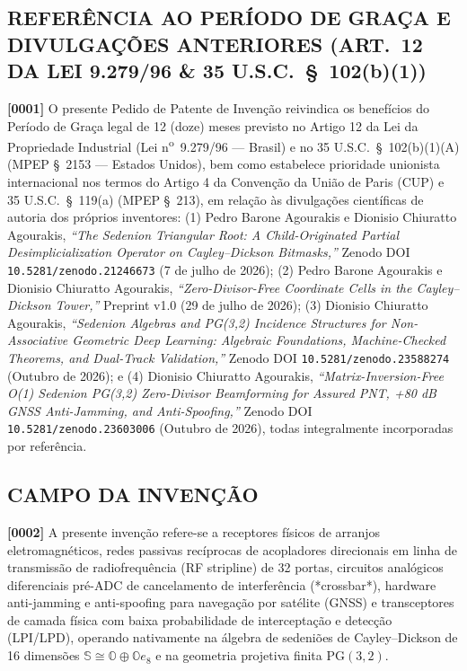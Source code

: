 \documentclass[12pt,a4paper]{article}
\begin{document}
\subsection*{REFER\^ENCIA AO PER\'IODO DE GRA\c{C}A E DIVULGA\c{C}\~OES ANTERIORES (ART.\ 12 DA LEI 9.279/96 \& 35 U.S.C.\ \S\ 102(b)(1))}
\textbf{[0001]} O presente Pedido de Patente de Inven\c{c}\~ao reivindica os benef\'icios do Per\'iodo de Gra\c{c}a legal de 12 (doze) meses previsto no Artigo 12 da Lei da Propriedade Industrial (Lei n\textsuperscript{o}\ 9.279/96 --- Brasil) e no 35 U.S.C.\ \S\ 102(b)(1)(A) (MPEP \S\ 2153 --- Estados Unidos), bem como estabelece prioridade unionista internacional nos termos do Artigo 4 da Conven\c{c}\~ao da Uni\~ao de Paris (CUP) e 35 U.S.C.\ \S\ 119(a) (MPEP \S\ 213), em rela\c{c}\~ao \`as divulga\c{c}\~oes cient\'ificas de autoria dos pr\'oprios inventores: (1) Pedro Barone Agourakis e Dionisio Chiuratto Agourakis, \textit{``The Sedenion Triangular Root: A Child-Originated Partial Desimplicialization Operator on Cayley--Dickson Bitmasks,''} Zenodo DOI \texttt{10.5281/zenodo.21246673} (7 de julho de 2026); (2) Pedro Barone Agourakis e Dionisio Chiuratto Agourakis, \textit{``Zero-Divisor-Free Coordinate Cells in the Cayley--Dickson Tower,''} Preprint v1.0 (29 de julho de 2026); (3) Dionisio Chiuratto Agourakis, \textit{``Sedenion Algebras and PG(3,2) Incidence Structures for Non-Associative Geometric Deep Learning: Algebraic Foundations, Machine-Checked Theorems, and Dual-Track Validation,''} Zenodo DOI \texttt{10.5281/zenodo.23588274} (Outubro de 2026); e (4) Dionisio Chiuratto Agourakis, \textit{``Matrix-Inversion-Free O(1) Sedenion PG(3,2) Zero-Divisor Beamforming for Assured PNT, +80 dB GNSS Anti-Jamming, and Anti-Spoofing,''} Zenodo DOI \texttt{10.5281/zenodo.23603006} (Outubro de 2026), todas integralmente incorporadas por refer\^encia.

\subsection*{CAMPO DA INVEN\c{C}\~AO}
\textbf{[0002]} A presente inven\c{c}\~ao refere-se a receptores f\'isicos de arranjos eletromagn\'eticos, redes passivas rec\'iprocas de acopladores direcionais em linha de transmiss\~ao de radiofrequ\^encia (RF stripline) de 32 portas, circuitos anal\'ogicos diferenciais pr\'e-ADC de cancelamento de interfer\^encia (*crossbar*), hardware anti-jamming e anti-spoofing para navega\c{c}\~ao por sat\'elite (GNSS) e transceptores de camada f\'isica com baixa probabilidade de intercepta\c{c}\~ao e detec\c{c}\~ao (LPI/LPD), operando nativamente na \'algebra de sedeni\~oes de Cayley--Dickson de 16 dimens\~oes $\mathbb{S} \cong \mathbb{O} \oplus \mathbb{O}e_8$ e na geometria projetiva finita $\mathrm{PG}(3,2)$.
\end{document}
